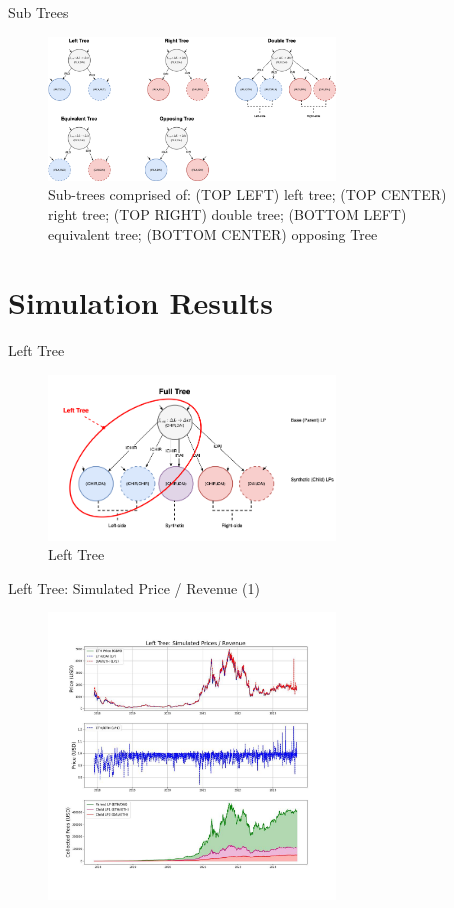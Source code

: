 \documentclass[10pt,xcolor=svgnames]{beamer} %
\begin{document}
\begin{frame}{Sub Trees} 

\begin{figure}[h!]
\includegraphics[width=3in]{img/sub_trees.png}
\caption{Sub-trees comprised of: (TOP LEFT) left tree; (TOP CENTER) right tree; (TOP RIGHT) double tree; (BOTTOM LEFT) equivalent tree; (BOTTOM CENTER) opposing Tree} 
\label{fig:sub_trees}
\end{figure}

\end{frame}


\section{Simulation Results}

\begin{frame}{Left Tree}

\begin{figure}[h!]
\includegraphics[width=3in]{img/left_tree.png}
\caption{Left Tree} 
\label{fig:left_tree}
\end{figure}

\end{frame}


\begin{frame}{Left Tree: Simulated Price / Revenue (1)}

\begin{figure}[h!]
\includegraphics[width=3in]{img/simulation.jpg}
\label{fig:simulation}
\end{figure}

\end{frame}
\end{document}
